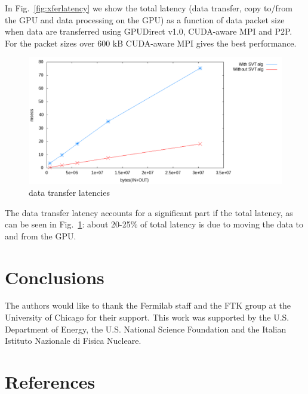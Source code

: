 \documentclass[letterpaper]{jpconf}
\begin{document}
In Fig.~\ref{fig:xferlatency} we show the total latency (data transfer, copy to/from the GPU and data processing on the GPU) as a function of data packet size when data are transferred using GPUDirect v1.0,
CUDA-aware MPI and P2P. For the packet sizes over 600 kB CUDA-aware MPI gives the best performance.


\begin{figure}[tbp]
  \centering
  \includegraphics[width=0.9\linewidth]{figures/cudaware.pdf}
  \caption{data transfer latencies}
  \label{fig:transferOnly}
\end{figure}

The data transfer latency accounts for a significant part if the total latency, 
as can be seen in Fig.~\ref{fig:transferOnly}: about 20-25\% of total latency  is due to moving the data to and from the GPU.


\section{Conclusions}


\ack
The authors would like to thank the Fermilab staff and the FTK group at the 
University of Chicago for their support. This work was supported by the
U.S. Department of Energy, the U.S. National Science Foundation and the Italian
Istituto Nazionale di Fisica Nucleare. 

\section*{References}

%

%
\end{document}
